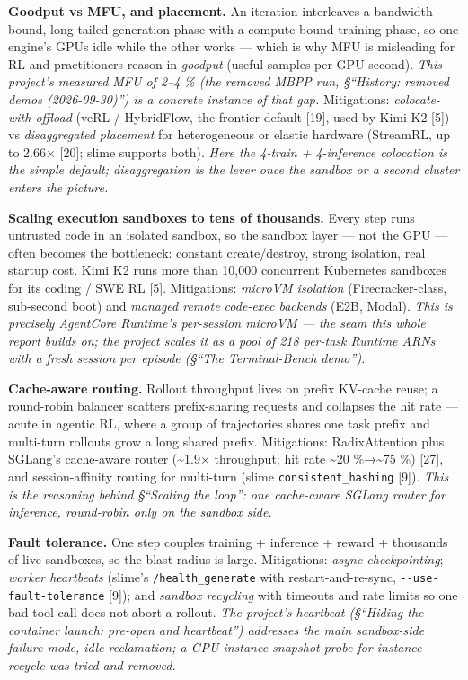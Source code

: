 \documentclass[
  paper=a4,
  ,captions=tableheading
]{scrartcl}
\begin{document}
\textbf{Goodput vs MFU, and placement.} An iteration interleaves a
bandwidth-bound, long-tailed generation phase with a compute-bound
training phase, so one engine's GPUs idle while the other works ---
which is why MFU is misleading for RL and practitioners reason in
\emph{goodput} (useful samples per GPU-second). \emph{This project's
measured MFU of 2--4 \% (the removed MBPP run, §``History: removed demos
(2026-09-30)'') is a concrete instance of that gap.} Mitigations:
\emph{colocate-with-offload} (veRL / HybridFlow, the frontier default
{[}19{]}, used by Kimi K2 {[}5{]}) vs \emph{disaggregated placement} for
heterogeneous or elastic hardware (StreamRL, up to 2.66× {[}20{]}; slime
supports both). \emph{Here the 4-train + 4-inference colocation is the
simple default; disaggregation is the lever once the sandbox or a second
cluster enters the picture.}

\textbf{Scaling execution sandboxes to tens of thousands.} Every step
runs untrusted code in an isolated sandbox, so the sandbox layer --- not
the GPU --- often becomes the bottleneck: constant create/destroy,
strong isolation, real startup cost. Kimi K2 runs more than 10,000
concurrent Kubernetes sandboxes for its coding / SWE RL {[}5{]}.
Mitigations: \emph{microVM isolation} (Firecracker-class, sub-second
boot) and \emph{managed remote code-exec backends} (E2B, Modal).
\emph{This is precisely AgentCore Runtime's per-session microVM --- the
seam this whole report builds on; the project scales it as a pool of 218
per-task Runtime ARNs with a fresh session per episode (§``The
Terminal-Bench demo'').}

\textbf{Cache-aware routing.} Rollout throughput lives on prefix
KV-cache reuse; a round-robin balancer scatters prefix-sharing requests
and collapses the hit rate --- acute in agentic RL, where a group of
trajectories shares one task prefix and multi-turn rollouts grow a long
shared prefix. Mitigations: RadixAttention plus SGLang's cache-aware
router (\textasciitilde1.9× throughput; hit rate \textasciitilde20
\%→\textasciitilde75 \%) {[}27{]}, and session-affinity routing for
multi-turn (slime \texttt{consistent\_hashing} {[}9{]}). \emph{This is
the reasoning behind §``Scaling the loop'': one cache-aware SGLang
router for inference, round-robin only on the sandbox side.}

\textbf{Fault tolerance.} One step couples training + inference + reward
+ thousands of live sandboxes, so the blast radius is large.
Mitigations: \emph{async checkpointing}; \emph{worker heartbeats}
(slime's \texttt{/health\_generate} with restart-and-re-sync,
\texttt{-\/-use-fault-tolerance} {[}9{]}); and \emph{sandbox recycling}
with timeouts and rate limits so one bad tool call does not abort a
rollout. \emph{The project's heartbeat (§``Hiding the container launch:
pre-open and heartbeat'') addresses the main sandbox-side failure mode,
idle reclamation; a GPU-instance snapshot probe for instance recycle was
tried and removed.}
\end{document}
